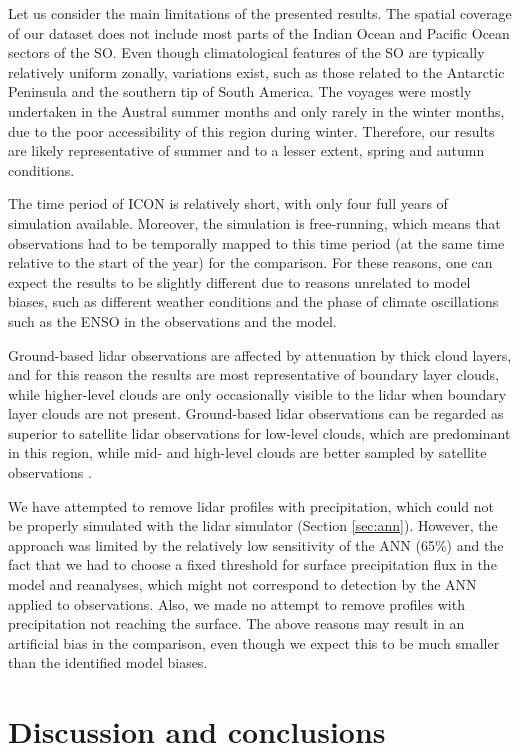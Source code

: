 \documentclass[12pt,a4paper]{article}
\begin{document}
Let us consider the main limitations of the presented results. The spatial
coverage of our dataset does not include most parts of the Indian Ocean and
Pacific Ocean sectors of the SO. Even though climatological features of the SO
are typically relatively uniform zonally, variations exist, such as those
related to the Antarctic Peninsula and the southern tip of South America. The
voyages were mostly undertaken in the Austral summer months and only rarely in
the winter months, due to the poor accessibility of this region during winter.
Therefore, our results are likely representative of summer and to a lesser
extent, spring and autumn conditions.

The time period of ICON is relatively short, with only four full years of
simulation available. Moreover, the simulation is free-running, which means
that observations had to be temporally mapped to this time period (at the same
time relative to the start of the year) for the comparison. For these reasons,
one can expect the results to be slightly different due to reasons unrelated to
model biases, such as different weather conditions and the phase of climate
oscillations such as the ENSO in the observations and the model.

Ground-based lidar observations are affected by attenuation by thick cloud
layers, and for this reason the results are most representative of boundary
layer clouds, while higher-level clouds are only occasionally visible to the
lidar when boundary layer clouds are not present. Ground-based lidar
observations can be regarded as superior to satellite lidar observations for
low-level clouds, which are predominant in this region, while mid- and
high-level clouds are better sampled by satellite observations
\citep{mcerlich2021}.

We have attempted to remove lidar profiles with precipitation, which could not be
properly simulated with the lidar simulator (Section \ref{sec:ann}). However,
the approach was limited by the relatively low sensitivity of the ANN (65\%)
and the fact that we had to choose a fixed threshold for surface precipitation
flux in the model and reanalyses, which might not correspond to
detection by the ANN applied to observations. Also, we made no attempt
to remove profiles with precipitation not reaching the surface. The above
reasons may result in an artificial bias in the comparison, even though we
expect this to be much smaller than the identified model biases.

\section{Discussion and conclusions}
\end{document}
